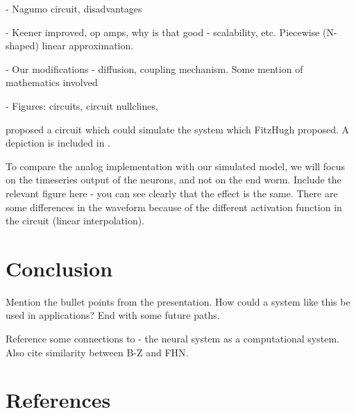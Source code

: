 \documentclass[
    11pt,
]{article}
\begin{document}
- Nagumo circuit, disadvantages

- Keener improved, op amps, why is that good - scalability, etc. Piecewise (N-shaped) linear approximation.

- Our modifications - diffusion, coupling mechanism.  Some mention of mathematics involved

- Figures: circuits, circuit nullclines,

\citet{nagumo1962} proposed a circuit which could simulate the system which FitzHugh proposed.  A depiction is included in .


To compare the analog implementation with our simulated model, we will focus on the timeseries output of the neurons, and not on the end worm.  Include the relevant figure here - you can see clearly that the effect is the same.  There are some differences in the waveform because of the different activation function in the circuit (linear interpolation).

%

\section{Conclusion}

Mention the bullet points from the presentation.  How could a system like this be used in applications?  End with some future paths.

Reference some connections to \citet{adamatzky2008} - the neural system as a computational system.  Also cite similarity between B-Z and FHN.

\section{References}

% 
\printbibliography[heading=none]
\end{document}

